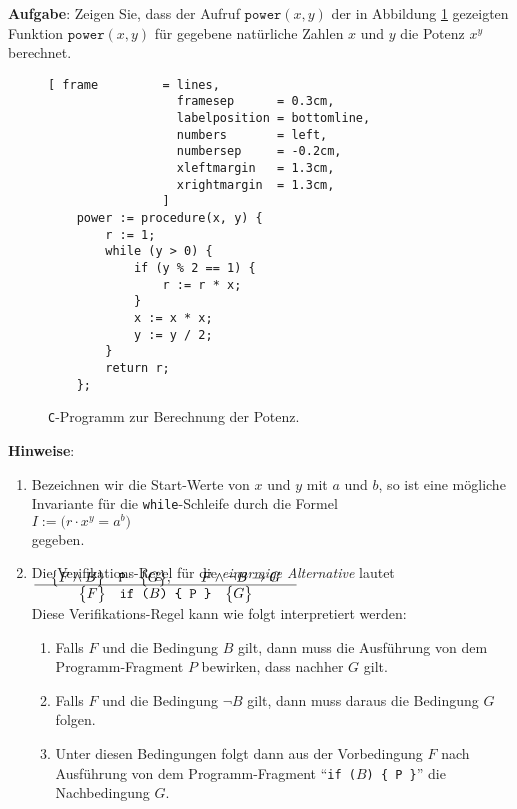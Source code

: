 \noindent
\textbf{Aufgabe}:  Zeigen Sie, dass der Aufruf $\texttt{power}(x,y)$ der in Abbildung
\ref{fig:power.c} gezeigten Funktion $\texttt{power}(x,y)$ f\"ur gegebene nat\"urliche Zahlen $x$
und $y$ die Potenz $x^y$ berechnet.
\vspace*{0.3cm}

\begin{figure}[!h]
\centering
\begin{Verbatim}[ frame         = lines, 
                  framesep      = 0.3cm, 
                  labelposition = bottomline,
                  numbers       = left,
                  numbersep     = -0.2cm,
                  xleftmargin   = 1.3cm,
                  xrightmargin  = 1.3cm,
                ]
    power := procedure(x, y) {
        r := 1;
        while (y > 0) {
            if (y % 2 == 1) {
                r := r * x;
            }
            x := x * x;
            y := y / 2;
        }
        return r;
    };
\end{Verbatim}
\vspace*{-0.3cm}
\caption{\texttt{C}-Programm zur Berechnung der Potenz.}
\label{fig:power.c}
\end{figure}

\noindent
\textbf{Hinweise}: 
\begin{enumerate}
\item Bezeichnen wir die Start-Werte von $x$ und $y$ mit $a$ und $b$,
      so ist eine m\"ogliche Invariante f\"ur die \texttt{while}-Schleife durch die Formel 
      \\[0.2cm]
      \hspace*{1.3cm}
      $I := \bigl(r \cdot x^y = a^b\bigr)$
      \\[0.2cm]
      gegeben.  
\item Die Verifikations-Regel f\"ur die \emph{einarmige Alternative} lautet
      \\[0.2cm]
      \hspace*{1.3cm}
      $\bruch{\quad\hoare{F \wedge B}{P}{G}, \qquad F \wedge \neg B \rightarrow G\quad}{
                     \hoare{F}{if ($B$) \{ P \}}{G}}
      $
      \\[0.2cm]
      Diese Verifikations-Regel kann wie folgt interpretiert werden:
      \begin{enumerate}
      \item Falls $F$ und die Bedingung $B$ gilt, dann muss die Ausf\"uhrung von 
            dem Programm-Fragment $P$ bewirken, dass nachher $G$ gilt.
      \item Falls $F$ und die Bedingung $\neg B$ gilt, dann muss daraus
            die Bedingung $G$ folgen.
      \item Unter diesen Bedingungen folgt dann aus der Vorbedingung $F$
            nach Ausf\"uhrung von dem Programm-Fragment ``\texttt{if ($B$) \{ P \}}''
            die Nachbedingung $G$.
      \end{enumerate}
\end{enumerate}
\pagebreak


